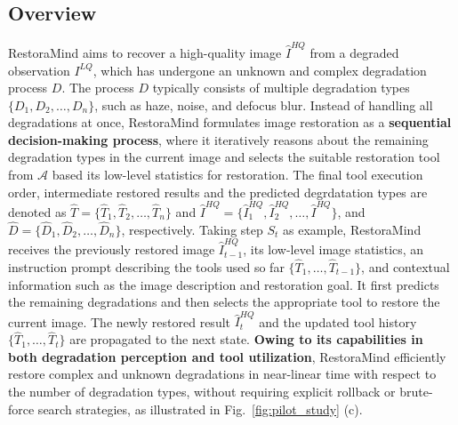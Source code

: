 \subsection{Overview}
\noindent
RestoraMind aims to recover a high-quality image $\hat{I}^{HQ}$ from a degraded observation $I^{LQ}$, which has undergone an unknown and complex degradation process $D$. The process $D$ typically consists of multiple degradation types $\{D_1, D_2, \dots, D_n\}$, such as haze, noise, and defocus blur. 
Instead of handling all degradations at once, RestoraMind formulates image restoration as a \textbf{sequential decision-making process}, where it iteratively reasons about the remaining degradation types in the current image and selects the suitable restoration tool from $\mathcal{A}$ based its low-level statistics for restoration. The final tool execution order, intermediate restored results and the predicted degrdatation types are denoted as $\hat{T} = \{\hat{T}_1, \hat{T}_2, \dots, \hat{T}_n\}$ and $\hat{I}^{HQ} = \{\hat{I}_1^{HQ}, \hat{I}_2^{HQ}, \dots, \hat{I}^{HQ}\}$, and ${\hat{D} = \{\hat{D}_1, \hat{D}_2, \dots, \hat{D}_n\}}$, respectively.
Taking step $S_t$ as example, RestoraMind receives the previously restored image $\hat{I}^{HQ}_{t-1}$, its low-level image statistics, an instruction prompt describing the tools used so far $\{\hat{T}_1, \dots, \hat{T}_{t-1}\}$, and contextual information such as the image description and restoration goal. 
It first predicts the remaining degradations and then selects the appropriate tool to restore the current image. 
The newly restored result $\hat{I}^{HQ}_{t}$ and the updated tool history $\{\hat{T}_1, \dots, \hat{T}_{t}\}$ are propagated to the next state. \textbf{Owing to its capabilities in both degradation perception and tool utilization}, RestoraMind efficiently restore complex and unknown degradations in near-linear time with respect to the number of degradation types, without requiring explicit rollback or brute-force search strategies, as illustrated in Fig.~\ref{fig:pilot_study} (c).




